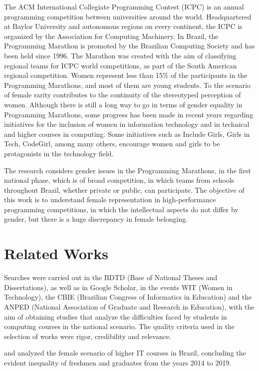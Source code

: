 \documentclass[12pt]{article}
\begin{document}
The ACM International Collegiate Programming Contest (ICPC) is an annual programming competition between universities around the world. Headquartered at Baylor University and autonomous regions on every continent, the ICPC is organized by the Association for Computing Machinery. In Brazil, the Programming Marathon is promoted by the Brazilian Computing Society and has been held since 1996. The Marathon was created with the aim of classifying regional teams for ICPC world competitions, as part of the South American regional competition.
Women represent less than 15\% of the participants in the Programming Marathons, and most of them are young students. To \cite{maia_2016} the scenario of female rarity contributes to the continuity of the stereotyped perception of women. Although there is still a long way to go in terms of gender equality in Programming Marathons, some progress has been made in recent years regarding initiatives for the inclusion of women in information technology and in technical and higher courses in computing. Some initiatives such as Include Girls, Girls in Tech, CodeGirl, among many others, encourage women and girls to be protagonists in the technology field.

The research considers gender issues in the Programming Marathons, in the first national phase, which is of broad competition, in which teams from schools throughout Brazil, whether private or public, can participate. The objective of this work is to understand female representation in high-performance programming competitions, in which the intellectual aspects do not differ by gender, but there is a huge discrepancy in female belonging.

\section{Related Works} \label{sec:firstpage}

Searches were carried out in the BDTD (Base of National Theses and Dissertations), as well as in Google Scholar, in the events WIT (Women in Technology), the CBIE (Brazilian Congress of Informatics in Education) and the ANPED (National Association of Graduate and Research in Education), with the aim of obtaining studies that analyze the difficulties faced by students in computing courses in the national scenario. The quality criteria used in the selection of works were rigor, credibility and relevance.

\cite{Santos:21} and \cite{maia_2016} analyzed the female scenario of higher IT courses in Brazil, concluding the evident inequality of freshmen and graduates from the years 2014 to 2019.
\end{document}
